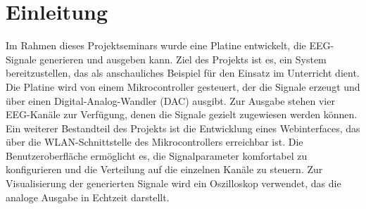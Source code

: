 \chapter{Einleitung}
\label{einleitung}

Im Rahmen dieses Projektseminars wurde eine Platine entwickelt, die EEG-Signale generieren und ausgeben kann.
Ziel des Projekts ist es, ein System bereitzustellen, das als anschauliches Beispiel für den Einsatz im Unterricht dient.
Die Platine wird von einem Mikrocontroller gesteuert, der die Signale erzeugt und über einen Digital-Analog-Wandler (DAC) ausgibt.
Zur Ausgabe stehen vier EEG-Kanäle zur Verfügung, denen die Signale gezielt zugewiesen werden können.
Ein weiterer Bestandteil des Projekts ist die Entwicklung eines Webinterfaces, das über die WLAN-Schnittstelle des Mikrocontrollers erreichbar ist.
Die Benutzeroberfläche ermöglicht es, die Signalparameter komfortabel zu konfigurieren und die Verteilung auf die einzelnen Kanäle zu steuern.
Zur Visualisierung der generierten Signale wird ein Oszilloskop verwendet, das die analoge Ausgabe in Echtzeit darstellt.